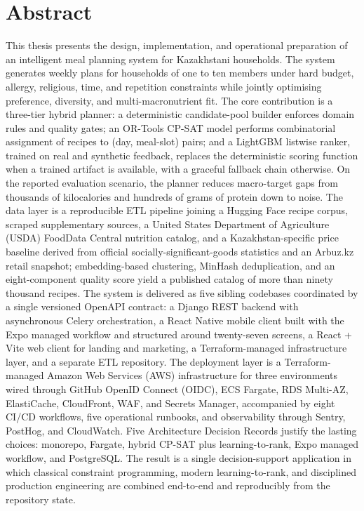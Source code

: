 %
%
\chapter{Abstract}
\begin{SingleSpace}

This thesis presents the design, implementation, and operational preparation of an intelligent meal planning system for Kazakhstani households. The system generates weekly plans for households of one to ten members under hard budget, allergy, religious, time, and repetition constraints while jointly optimising preference, diversity, and multi-macronutrient fit. The core contribution is a three-tier hybrid planner: a deterministic candidate-pool builder enforces domain rules and quality gates; an OR-Tools CP-SAT model performs combinatorial assignment of recipes to (day, meal-slot) pairs; and a LightGBM listwise ranker, trained on real and synthetic feedback, replaces the deterministic scoring function when a trained artifact is available, with a graceful fallback chain otherwise. On the reported evaluation scenario, the planner reduces macro-target gaps from thousands of kilocalories and hundreds of grams of protein down to noise. The data layer is a reproducible ETL pipeline joining a Hugging Face recipe corpus, scraped supplementary sources, a United States Department of Agriculture (USDA) FoodData Central nutrition catalog, and a Kazakhstan-specific price baseline derived from official socially-significant-goods statistics and an Arbuz.kz retail snapshot; embedding-based clustering, MinHash deduplication, and an eight-component quality score yield a published catalog of more than ninety thousand recipes. The system is delivered as five sibling codebases coordinated by a single versioned OpenAPI contract: a Django REST backend with asynchronous Celery orchestration, a React Native mobile client built with the Expo managed workflow and structured around twenty-seven screens, a React + Vite web client for landing and marketing, a Terraform-managed infrastructure layer, and a separate ETL repository. The deployment layer is a Terraform-managed Amazon Web Services (AWS) infrastructure for three environments wired through GitHub OpenID Connect (OIDC), ECS Fargate, RDS Multi-AZ, ElastiCache, CloudFront, WAF, and Secrets Manager, accompanied by eight CI/CD workflows, five operational runbooks, and observability through Sentry, PostHog, and CloudWatch. Five Architecture Decision Records justify the lasting choices: monorepo, Fargate, hybrid CP-SAT plus learning-to-rank, Expo managed workflow, and PostgreSQL. The result is a single decision-support application in which classical constraint programming, modern learning-to-rank, and disciplined production engineering are combined end-to-end and reproducibly from the repository state.


\end{SingleSpace}
\clearpage
